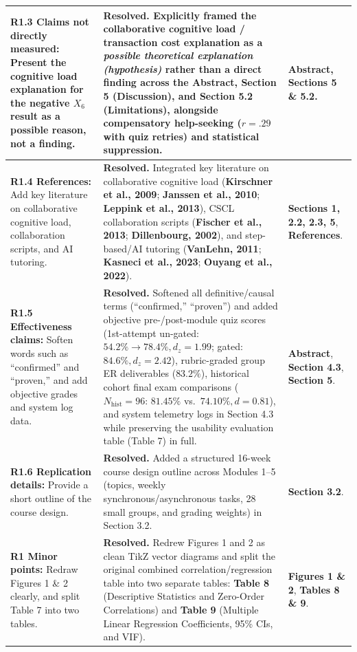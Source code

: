 \documentclass[11pt, a4paper]{article}
\begin{document}
\begin{longtable}{@{} >{\raggedright\arraybackslash}p{3.9cm} >{\raggedright\arraybackslash}p{8.8cm} >{\raggedright\arraybackslash}p{2.9cm} @{}}
\textbf{R1.3 Claims not directly measured:} Present the cognitive load explanation for the negative $X_6$ result as a possible reason, not a finding. 
& 
\textbf{Resolved.} Explicitly framed the collaborative cognitive load / transaction cost explanation as a \textit{possible theoretical explanation (hypothesis)} rather than a direct finding across the Abstract, Section 5 (Discussion), and Section 5.2 (Limitations), alongside compensatory help-seeking ($r = .29$ with quiz retries) and statistical suppression.
& 
\textbf{Abstract}, \newline \textbf{Sections 5 \& 5.2}. \tabularnewline
\midrule

\textbf{R1.4 References:} Add key literature on collaborative cognitive load, collaboration scripts, and AI tutoring. 
& 
\textbf{Resolved.} Integrated key literature on collaborative cognitive load (\textbf{Kirschner et al., 2009}; \textbf{Janssen et al., 2010}; \textbf{Leppink et al., 2013}), CSCL collaboration scripts (\textbf{Fischer et al., 2013}; \textbf{Dillenbourg, 2002}), and step-based/AI tutoring (\textbf{VanLehn, 2011}; \textbf{Kasneci et al., 2023}; \textbf{Ouyang et al., 2022}).
& 
\textbf{Sections 1, 2.2, 2.3, 5}, \newline \textbf{References}. \tabularnewline
\midrule

\textbf{R1.5 Effectiveness claims:} Soften words such as ``confirmed'' and ``proven,'' and add objective grades and system log data. 
& 
\textbf{Resolved.} Softened all definitive/causal terms (``confirmed,'' ``proven'') and added objective pre-/post-module quiz scores (1st-attempt un-gated: $54.2\% \rightarrow 78.4\%, d_z = 1.99$; gated: $84.6\%, d_z = 2.42$), rubric-graded group ER deliverables ($83.2\%$), historical cohort final exam comparisons ($N_{\text{hist}} = 96$: $81.45\%$ vs.\ $74.10\%, d = 0.81$), and system telemetry logs in Section 4.3 while preserving the usability evaluation table (Table 7) in full.
& 
\textbf{Abstract}, \newline \textbf{Section 4.3}, \newline \textbf{Section 5}. \tabularnewline
\midrule

\textbf{R1.6 Replication details:} Provide a short outline of the course design. 
& 
\textbf{Resolved.} Added a structured 16-week course design outline across Modules 1--5 (topics, weekly synchronous/asynchronous tasks, 28 small groups, and grading weights) in Section 3.2.
& 
\textbf{Section 3.2}. \tabularnewline
\midrule

\textbf{R1 Minor points:} Redraw Figures 1 \& 2 clearly, and split Table 7 into two tables. 
& 
\textbf{Resolved.} Redrew Figures 1 and 2 as clean TikZ vector diagrams and split the original combined correlation/regression table into two separate tables: \textbf{Table 8} (Descriptive Statistics and Zero-Order Correlations) and \textbf{Table 9} (Multiple Linear Regression Coefficients, 95\% CIs, and VIF).
& 
\textbf{Figures 1 \& 2}, \newline \textbf{Tables 8 \& 9}. \tabularnewline
\midrule


\end{longtable}
\end{document}

